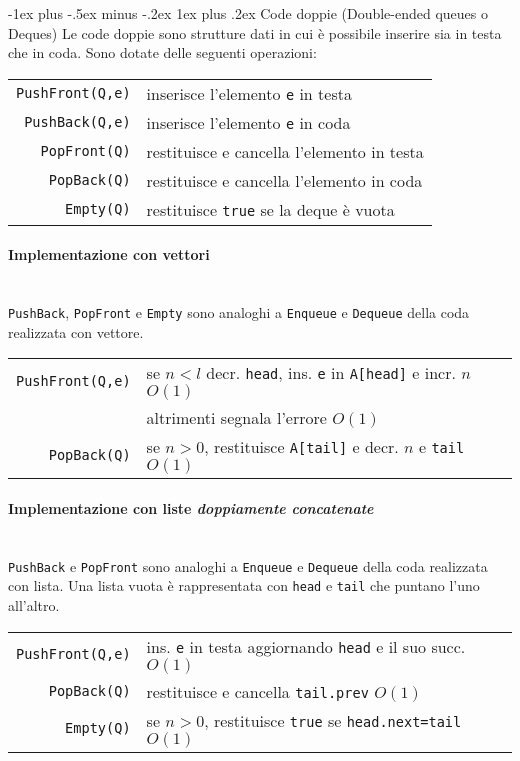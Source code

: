 \documentclass[10pt,landscape]{article}
\makeatletter
\renewcommand{\subsubsection}{\@startsection{subsubsection}{3}{0mm}%
                                {-1ex plus -.5ex minus -.2ex}%
                                {1ex plus .2ex}%
                                {\normalfont\normalsize\bfseries}}
\newcommand{\myparagraph}[1]{\paragraph{#1}\mbox{}\\ [5pt]}
\makeatother
\begin{document}
\begin{multicols*}{4}
                \subsubsection{Code doppie (Double-ended queues o Deques)}
                Le code doppie sono strutture dati in cui è possibile inserire sia in testa che in coda. Sono dotate delle seguenti operazioni: \\ [3pt]
                \begin{tabular}{rl}
                        \verb|PushFront(Q,e)| & inserisce l'elemento \verb|e| in testa      \\
                        \verb|PushBack(Q,e)|  & inserisce l'elemento \verb|e| in coda       \\
                        \verb|PopFront(Q)|    & restituisce e cancella l'elemento in testa  \\
                        \verb|PopBack(Q)|     & restituisce e cancella l'elemento in coda   \\
                        \verb|Empty(Q)|       & restituisce \verb|true| se la deque è vuota \\
                \end{tabular}
                \myparagraph{Implementazione con vettori}
                \verb|PushBack|, \verb|PopFront| e \verb|Empty| sono analoghi a \verb|Enqueue| e \verb|Dequeue| della coda realizzata con vettore. \\ [3pt]
                \begin{tabular}{rl}
                        \verb|PushFront(Q,e)| & se $n<l$ decr. \verb|head|, ins. \verb|e| in \verb|A[head]| e incr. $n$ $O(1)$ \\
                                              & altrimenti segnala l'errore $O(1)$                                             \\
                        \verb|PopBack(Q)|     & se $n>0$, restituisce \verb|A[tail]| e decr. $n$ e \verb|tail|  $O(1)$         \\
                \end{tabular}
                \myparagraph{Implementazione con liste \textit{doppiamente concatenate}}
                \verb|PushBack| e \verb|PopFront| sono analoghi a \verb|Enqueue| e \verb|Dequeue| della coda realizzata con lista. Una lista vuota è rappresentata con \verb|head| e \verb|tail| che puntano l'uno all'altro.\\ [3pt]
                \begin{tabular}{rl}
                        \verb|PushFront(Q,e)| & ins. \verb|e| in testa aggiornando \verb|head| e il suo succ.  $O(1)$     \\
                        \verb|PopBack(Q)|     & restituisce e cancella \verb|tail.prev|                            $O(1)$ \\
                        \verb|Empty(Q)|       & se $n>0$, restituisce \verb|true| se \verb|head.next=tail|         $O(1)$ \\
                \end{tabular}


\end{multicols*}
\end{document}
